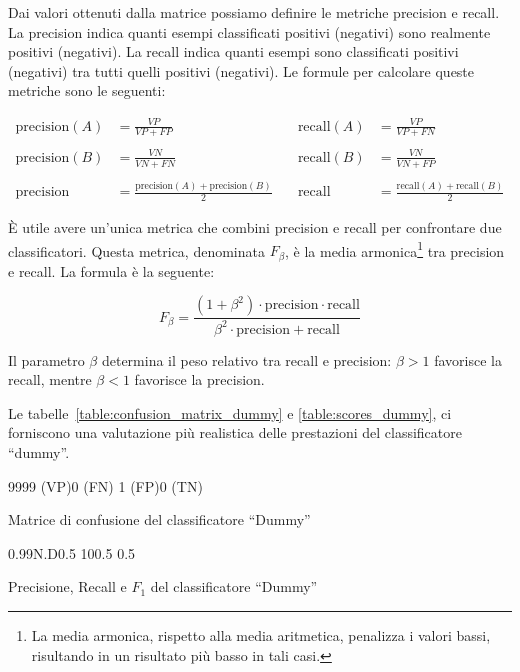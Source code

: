 Dai valori ottenuti dalla matrice possiamo definire le metriche precision e
recall. La precision indica quanti esempi classificati positivi (negativi)
sono realmente positivi (negativi). La recall indica quanti esempi sono
classificati positivi (negativi) tra tutti quelli positivi (negativi). Le
formule per calcolare queste metriche sono le seguenti:

$$\begin{aligned}
    \text{precision}(A) &= \frac{VP}{VP + FP} & \quad \text{recall}(A) &= \frac{VP}{VP + FN} \\
    \\
    \text{precision}(B) &= \frac{VN}{VN + FN} & \quad \text{recall}(B) &= \frac{VN}{VN + FP} \\
    \\
    \text{precision} &= \frac{\text{precision}(A) + \text{precision}(B)}{2} & \quad \text{recall} &= \frac{\text{recall}(A) + \text{recall}(B)}{2}
\end{aligned}$$

È utile avere un'unica metrica che combini precision e recall per confrontare
due classificatori. Questa metrica, denominata $F_\beta$, è la media
armonica\footnote{La media armonica, rispetto alla media aritmetica, penalizza
i valori bassi, risultando in un risultato più basso in tali casi.} tra
precision e recall. La formula è la seguente:

$$F_\beta=\frac{(1+\beta^2)\cdot\text{precision}\cdot\text{recall}}{\beta^2\cdot\text{precision}+\text{recall}}$$

Il parametro $\beta$ determina il peso relativo tra recall e precision:
$\beta>1$ favorisce la recall, mentre $\beta<1$ favorisce la precision.

Le tabelle~\ref{table:confusion_matrix_dummy} e \ref{table:scores_dummy}, ci
forniscono una valutazione più realistica delle prestazioni del classificatore
``dummy''.

\begin{table}[!ht]
    \centering
    \confusionmatrix%
    {9999 (VP)}{0 (FN)}%
    {1 (FP)}{0 (TN)}
    \caption{Matrice di confusione del classificatore ``Dummy''}
    \label{table:confusion_matrix_dummy}
\end{table}

\begin{table}[!ht]
    \centering
    \scores%
    {0.99}{N.D}{0.5}%
    {1}{0}{0.5}%
    {0.5}
    \caption{Precisione, Recall e $F_1$ del classificatore ``Dummy''}
    \label{table:scores_dummy}
\end{table}


